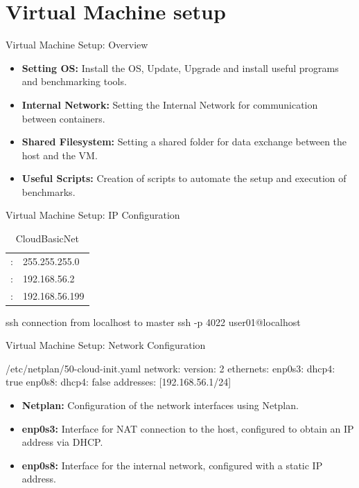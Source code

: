 \documentclass[10pt, english, xcolor={dvipsnames, table}]{beamer}
\begin{document}
\section{Virtual Machine setup}
\begin{frame}{Virtual Machine Setup: Overview}
    \begin{itemize}
        \item \textbf{\color{UniOrange}Setting OS:} Install the OS, Update, Upgrade and install useful programs and benchmarking tools.
        \item \textbf{\color{UniOrange}Internal Network:} Setting the Internal Network for communication between containers.
        \item \textbf{\color{UniOrange}Shared Filesystem:} Setting a shared folder for data exchange between the host and the VM.
        \item \textbf{\color{UniOrange}Useful Scripts:} Creation of scripts to automate the setup and execution of benchmarks.
    \end{itemize}
\end{frame}

\begin{frame}[fragile]{Virtual Machine Setup: IP Configuration}
    \begin{table}[H]
        \centering
        \begin{tabular}{r|l}
            \color{UniOrange}{Mask}:        & 255.255.255.0  \\
            \color{UniOrange}{Lower Bound}: & 192.168.56.2   \\
            \color{UniOrange}{Upper Bound}: & 192.168.56.199
        \end{tabular}
        \caption{CloudBasicNet}
        \label{tab:ip_settings}
    \end{table}
    \begin{codice}[style=bashstyle]{ssh connection from localhost to master}
        ssh -p 4022 user01@localhost
    \end{codice}
\end{frame}

\begin{frame}[fragile]{Virtual Machine Setup: Network Configuration}
    \begin{codice}[style=bashstyle]{/etc/netplan/50-cloud-init.yaml}
        network:
        version: 2
        ethernets:
        enp0s3:
        dhcp4: true
        enp0s8:
        dhcp4: false
        addresses: [192.168.56.1/24]
    \end{codice}
    \begin{itemize}
        \item \textbf{\color{UniOrange}Netplan:} Configuration of the network interfaces using Netplan.
        \item \textbf{\color{UniOrange}enp0s3:} Interface for NAT connection to the host, configured to obtain an IP address via DHCP.
        \item \textbf{\color{UniOrange}enp0s8:} Interface for the internal network, configured with a static IP address.
    \end{itemize}
\end{frame}
\end{document}
